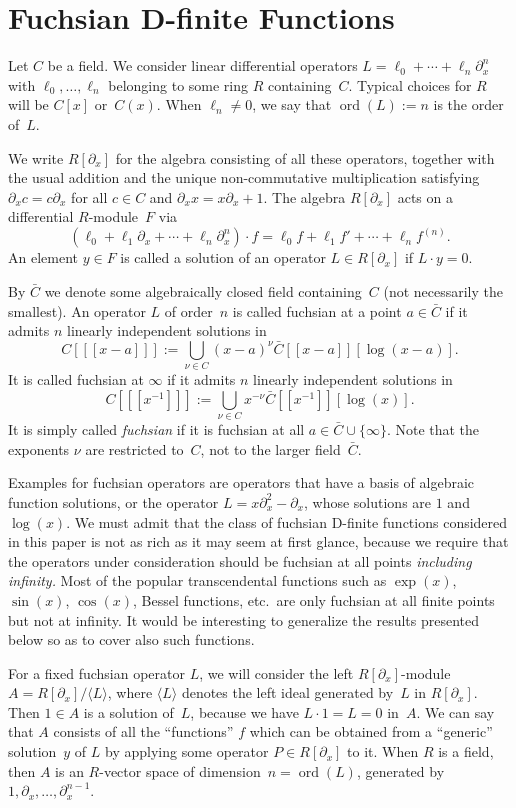 \documentclass{sig-alternate}
\def\ord{\operatorname{ord}}
\def\<#1>{\langle#1\rangle}
\begin{document}
\section{Fuchsian D-finite Functions}

Let $C$ be a field. We consider linear differential operators
$L=\ell_0+\cdots+\ell_n\partial_x^n$ with $\ell_0,\dots,\ell_n$ belonging to some ring
$R$ containing~$C$.
Typical choices for $R$ will be $C[x]$ or~$C(x)$.
When $\ell_n\neq0$, we say that $\ord(L):=n$ is the order of~$L$.

We write $R[\partial_x]$ for the algebra consisting of all these operators, together
with the usual addition and the unique non-commutative multiplication satisfying
$\partial_xc=c\partial_x$ for all $c\in C$ and $\partial_xx=x\partial_x+1$.
The algebra $R[\partial_x]$ acts on a differential $R$-module~$F$ via
\[
  (\ell_0+\ell_1\partial_x+\cdots+\ell_n\partial_x^n)\cdot f=
   \ell_0f + \ell_1f' + \cdots + \ell_n f^{(n)}.
\]
An element $y\in F$ is called a solution of an operator $L\in R[\partial_x]$ if
$L\cdot y=0$.

By $\bar C$ we denote some algebraically closed field containing~$C$ (not necessarily the smallest).
An operator $L$ of order~$n$ is called fuchsian at a point $a\in\bar C$ if
it admits $n$ linearly independent solutions in
\[
  C[[[x-a]]] := \bigcup_{\nu\in C} (x-a)^\nu\bar C[[x-a]][\log(x-a)].
\]
It is called fuchsian at $\infty$ if it admits $n$ linearly independent solutions in
\[
  C[[[x^{-1}]]] := \bigcup_{\nu\in C} x^{-\nu} \bar C[[x^{-1}]][\log(x)].
\]
It is simply called \emph{fuchsian} if it is fuchsian at all $a\in\bar C\cup\{\infty\}$.
Note that the exponents $\nu$ are restricted to~$C$, not to the larger field~$\bar C$.

Examples for fuchsian operators are operators that have a basis of algebraic
function solutions, or the operator $L=x\partial_x^2-\partial_x$, whose
solutions are $1$ and $\log(x)$.  We must admit that the class of fuchsian D-finite functions
considered in this paper is not as rich as it may seem at first glance, because
we require that the operators under consideration should be fuchsian at all
points \emph{including infinity.} Most of the popular transcendental functions
such as $\exp(x)$, $\sin(x)$, $\cos(x)$, Bessel functions, etc.\ are only
fuchsian at all finite points but not at infinity. It would be interesting to
generalize the results presented below so as to cover also such functions.

For a fixed fuchsian operator $L$, we will consider the left $R[\partial_x]$-module
$A=R[\partial_x]/\<L>$, where $\<L>$ denotes the left ideal generated by~$L$ in
$R[\partial_x]$.  Then $1\in A$ is a solution of~$L$, because we have $L\cdot 1=L=0$
in~$A$. We can say that $A$ consists of all the ``functions'' $f$ which can be
obtained from a ``generic'' solution~$y$ of $L$ by applying some operator $P\in
R[\partial_x]$ to it. When $R$ is a field, then $A$ is an $R$-vector space of
dimension~$n=\ord(L)$, generated by $1,\partial_x,\dots,\partial_x^{n-1}$.
\end{document}
